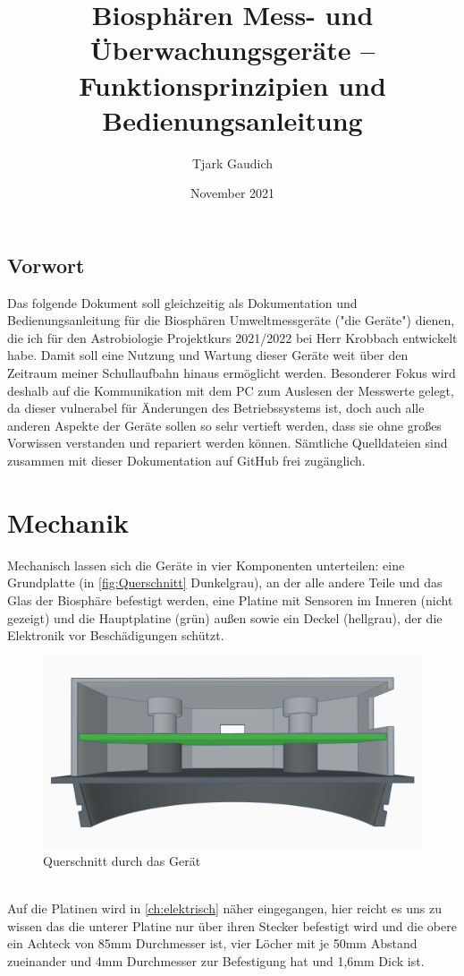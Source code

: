 \documentclass[12pt, a4paper, oneside]{report}
\title{\textbf{Biosphären Mess- und Überwachungsgeräte -- Funktionsprinzipien und Bedienungsanleitung}}
\author{Tjark Gaudich}
\date{November 2021}
\begin{document}
\maketitle

\section{Vorwort}
Das folgende Dokument soll gleichzeitig als Dokumentation und Bedienungsanleitung für die Biosphären Umweltmessgeräte ("die Geräte") dienen, die ich für den Astrobiologie Projektkurs 2021/2022 bei Herr Krobbach entwickelt habe. Damit soll eine Nutzung und Wartung dieser Geräte weit über den Zeitraum meiner Schullaufbahn hinaus ermöglicht werden. Besonderer Fokus wird deshalb auf die Kommunikation mit dem PC zum Auslesen der Messwerte gelegt, da dieser vulnerabel für Änderungen des Betriebssystems ist, doch auch alle anderen Aspekte der Geräte sollen so sehr vertieft werden, dass sie ohne großes Vorwissen verstanden und repariert werden können. Sämtliche Quelldateien sind zusammen mit dieser Dokumentation auf 
GitHub\cite{Github} frei zugänglich.
\tableofcontents
\listoffigures

\chapter{Mechanik}

Mechanisch lassen sich die Geräte in vier Komponenten unterteilen:
eine Grundplatte (in \autoref{fig:Querschnitt} Dunkelgrau), an der alle andere Teile und das Glas der Biosphäre befestigt werden, eine Platine mit Sensoren im Inneren (nicht gezeigt) und die Hauptplatine (grün) außen sowie ein Deckel (hellgrau), der die Elektronik vor Beschädigungen schützt.
\begin{figure}[h]
	\centering
	\includegraphics[width=1\textwidth]{pic/Querschnitt}
	\caption{Querschnitt durch das Gerät}
	\label{fig:Querschnitt}
\end{figure}
\\Auf die Platinen wird in \autoref{ch:elektrisch} näher eingegangen, hier reicht es uns zu wissen das die unterer Platine nur über ihren Stecker befestigt wird und die obere ein Achteck von 85mm Durchmesser ist, vier Löcher mit je 50mm Abstand zueinander und 4mm Durchmesser zur Befestigung hat und 1,6mm Dick ist.
\end{document}
